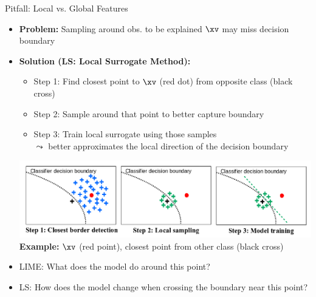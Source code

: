 \documentclass[11pt,compress,t,notes=noshow, aspectratio=169, xcolor=table]{beamer}
\begin{document}
\begin{frame}{Pitfall: Local vs. Global Features }
		\begin{itemize}
             \item \textbf{Problem:} Sampling around obs. to be explained $\xv$ may miss decision boundary
		\item \textbf{Solution (LS: Local Surrogate Method):}
  \begin{itemize}
    \item Step 1: Find closest point to $\xv$ (red dot) from opposite class (black cross)
    \item Step 2: Sample around that point to better capture boundary
    \item Step 3: Train local surrogate using those samples\\
		$\leadsto$ better approximates the local direction of the decision boundary 
    \end{itemize}
		\begin{center}
		\includegraphics[width=\linewidth]{figure/laugel_method}
		\scriptsize{\textbf{Example:} $\xv$ (red point), closest point from other class (black cross)}
		\end{center}

    \item LIME: What does the model do around this point?
    \item LS: How does the model change when crossing the boundary near this point?
	\end{itemize}


\end{frame}
\end{document}
